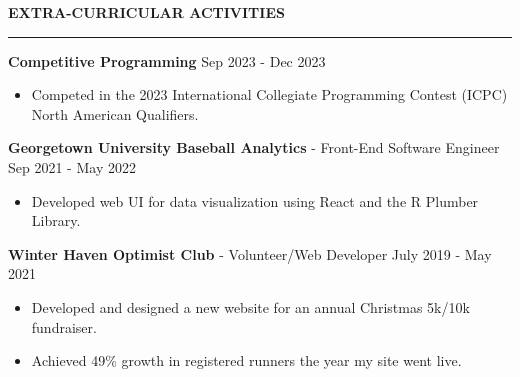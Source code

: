 \documentclass[11pt,letterpaper]{article}
\begin{document}
\medskip
\MakeUppercase{{\bf Extra-Curricular Activities}}
\medskip
\hrule
\begin{list}{}{\setlength{\leftmargin}{0em}}

    \item
    \textbf{Competitive Programming} \hfill Sep 2023 - Dec 2023
    \begin{itemize}[topsep=-5pt, noitemsep]
        \item Competed in the 2023 International Collegiate Programming Contest (ICPC) North American Qualifiers.
    \end{itemize}
    \item
          \textbf{Georgetown University Baseball Analytics} - Front-End Software Engineer \hfill Sep 2021 - May 2022
          \begin{itemize}[topsep=-5pt, noitemsep]
              \item Developed web UI for data visualization using React and the R Plumber Library.
          \end{itemize}
    \item
          \textbf{Winter Haven Optimist Club} - Volunteer/Web Developer \hfill July 2019 - May 2021
          \begin{itemize}[topsep=-5pt, noitemsep]
              \item Developed and designed a new website for an annual Christmas 5k/10k fundraiser.
              \item Achieved 49\% growth in registered runners the year my site went live.
          \end{itemize}
\end{list}
\end{document}
